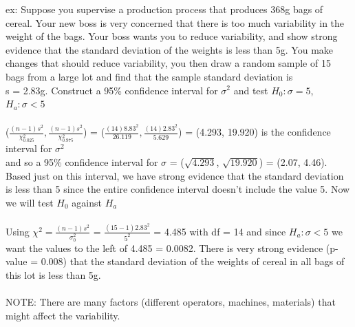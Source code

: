 \documentclass[12pt, a4paper]{article}
\begin{document}
	ex: Suppose you supervise a production process that produces 368g bags of cereal. Your new boss is very concerned that there is too much variability in the weight of the bags. Your boss wants you to reduce variability, and show strong evidence that the standard deviation of the weights is less than 5g. You make changes that should reduce variability, you then draw a random sample of 15 bags from a large lot and find that the sample standard deviation is \\ s = 2.83g. Construct a 95\% confidence interval for $\sigma^2$ and test $H_0: \sigma = 5$, $H_a: \sigma < 5$ \\~\\
	($\frac{(n-1)s^2}{\chi^2_{0.025}}, \frac{(n-1)s^2}{\chi^2_{0.975}}$) = ($\frac{(14)8.83^2}{26.119}, \frac{(14)2.83^2}{5.629}$) = (4.293, 19.920) is the confidence interval for $\sigma^2$ \\ and so a 95\% confidence interval for $\sigma$ = ($\sqrt{4.293}$, $\sqrt{19.920}$) = (2.07, 4.46). Based just on this interval, we have strong evidence that the standard deviation is less than 5 since the entire confidence interval doesn't include the value 5. Now we will test $H_0$ against $H_a$ \\~\\ Using $\chi^2 = \frac{(n-1)s^2}{\sigma^2_0}$ = $\frac{(15-1)2.83^2}{5^2}$ = 4.485 with df = 14 and since $H_a: \sigma < 5$ we want the values to the left of 4.485 = 0.0082. There is very strong evidence (p-value = 0.008) that the standard deviation of the weights of cereal in all bags of this lot is less than 5g. \\~\\ NOTE: There are many factors (different operators, machines, materials) that might affect the variability. \newpage
	
\end{document}
